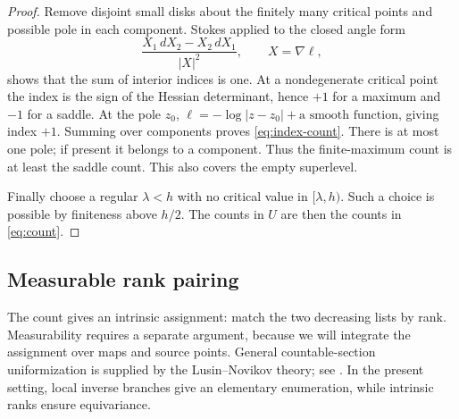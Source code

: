 \begin{proof}
Remove disjoint small disks about the finitely many critical points
and possible pole in each component. Stokes applied to the closed
angle form
\[
 \frac{X_1\,dX_2-X_2\,dX_1}{|X|^2},\qquad X=\nabla\ell,
\]
shows that the sum of interior indices is one.
At a nondegenerate critical point the index is the sign of the
Hessian determinant, hence \(+1\) for a maximum and \(-1\) for
a saddle. At the pole \(z_0\),
\(\ell=-\log|z-z_0|+\text{a smooth function}\), giving index \(+1\).
Summing over components proves \eqref{eq:index-count}.
There is at most one pole; if present it belongs to a component.
Thus the finite-maximum count is at least the saddle count.
This also covers the empty superlevel.

Finally choose a regular \(\lambda<h\) with no critical value
in \([\lambda,h)\). Such a choice is possible by finiteness
above \(h/2\). The counts in \(U\) are then the counts in
\eqref{eq:count}.
\end{proof}

\subsection{Measurable rank pairing}

The count gives an intrinsic assignment: match the two decreasing
lists by rank. Measurability requires a separate argument, because
we will integrate the assignment over maps and source points. General
countable-section uniformization is supplied by the Lusin--Novikov
theory; see \cite[4F.6 and 4F.17]{Moschovakis}. In the present
setting, local inverse branches give an elementary enumeration, while
intrinsic ranks ensure equivariance.

